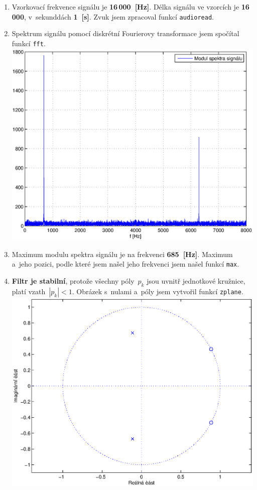 \documentclass[a4paper, 11pt, twocolumn]{article}
\begin{document}
	\begin{enumerate}
		\item
			Vzorkovací frekvence signálu je \textbf{16\,000~[Hz]}.
			Délka signálu ve vzorcích je \textbf{16\,000}, v~sekunddách \textbf{1~[s]}.
			Zvuk jsem zpracoval funkcí \texttt{audioread}.

		\item
			Spektrum signálu pomocí diskrétní Fourierovy transformace
			jsem spočítal funkcí \texttt{fft}.
			\\ \includegraphics[width=\linewidth]{inc/2.eps}

		\item
			Maximum modulu spektra signálu je na frekvenci \textbf{685~[Hz]}.
			Maximum a~jeho pozici, podle které jsem našel jeho frekvenci jsem našel funkcí \texttt{max}.

		\item
			\textbf{Filtr je stabilní}, protože všechny póly~$ p_k $ jsou uvnitř jednotkové kružnice,
			platí vzath~$ |p_k| < 1 $.
			Obrázek s~nulami a~póly jsem vytvořil funkcí \texttt{zplane}.
			\\ \includegraphics[width=\linewidth]{inc/4.eps}


\end{enumerate}
\end{document}
